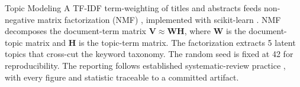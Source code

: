 \documentclass[
  ignorenonframetext,
]{beamer}
\begin{document}
\begin{frame}[allowframebreaks]{Topic Modeling}
\protect{}\label{topic-modeling}
A TF-IDF term-weighting of titles and abstracts 
feeds non-negative matrix factorization (NMF) ,
implemented with scikit-learn . NMF decomposes
the document-term matrix \(\mathbf{V} \approx \mathbf{W} \mathbf{H}\),
where \(\mathbf{W}\) is the document-topic matrix and \(\mathbf{H}\) is
the topic-term matrix. The factorization extracts 5 latent topics that
cross-cut the keyword taxonomy. The random seed is fixed at 42 for
reproducibility. The reporting follows established systematic-review
practice , with every figure and statistic
traceable to a committed artifact.
\end{frame}
\end{document}
